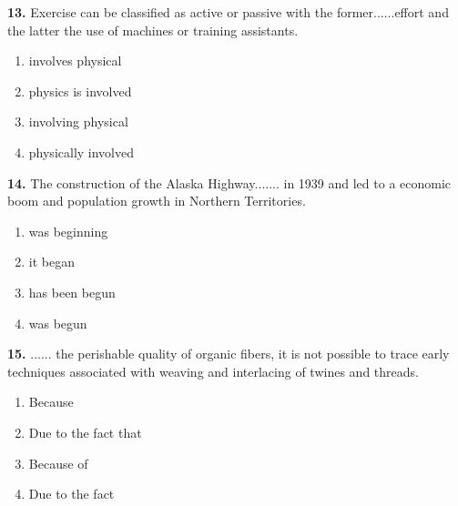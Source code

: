 \documentclass[12pt]{article}
\begin{document}
\par
\vspace{0.25\baselineskip}
\noindent\textbf{13.} Exercise can be classified as active or passive with the former......effort and the latter the use of machines or training assistants.
\begin{enumerate}[label=(\Alph*),leftmargin=*,itemsep=0.2em]
\item involves physical
\item physics is involved
\item involving physical
\item physically involved
\end{enumerate}
\par
\vspace{0.25\baselineskip}
\noindent\textbf{14.} The construction of the Alaska Highway....... in 1939 and led to a economic boom and population growth in Northern Territories.
\begin{enumerate}[label=(\Alph*),leftmargin=*,itemsep=0.2em]
\item was beginning
\item it began
\item has been begun
\item was begun
\end{enumerate}
\par
\vspace{0.25\baselineskip}
\noindent\textbf{15.} ...... the perishable quality of organic fibers, it is not possible to trace early techniques associated with weaving and interlacing of twines and threads.
\begin{enumerate}[label=(\Alph*),leftmargin=*,itemsep=0.2em]
\item Because
\item Due to the fact that
\item Because of
\item Due to the fact
\end{enumerate}
\par
\vspace{0.25\baselineskip}
\end{document}
